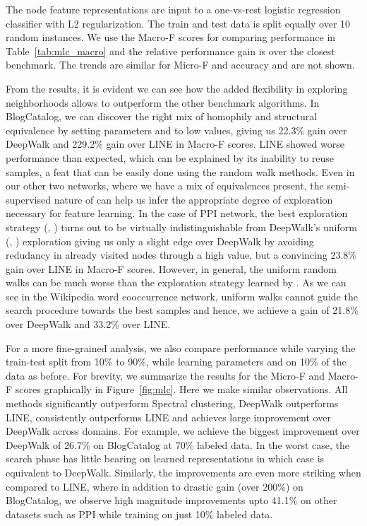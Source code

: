 The node feature representations are input to a one-vs-rest logistic regression classifier with L2 regularization. The train and test data is split equally over 10 random instances. We use the Macro-F scores for comparing performance in Table~\ref{tab:mlc_macro} and the relative performance gain is over the closest benchmark. The trends are similar for Micro-F and accuracy and are not shown. 

From the results, it is evident we can see how the added flexibility in exploring neighborhoods allows \nodevec to outperform the other benchmark algorithms. In BlogCatalog, we can discover the right mix of homophily and structural equivalence by setting parameters  and  to low values, giving us 22.3\% gain over DeepWalk and 229.2\% gain over LINE in Macro-F scores. LINE showed worse performance than expected, which can be explained by its inability to reuse samples, a feat that can be easily done using the random walk methods. Even in our other two networks, where we have a mix of equivalences present, the semi-supervised nature of \nodevec can help us infer the appropriate degree of exploration necessary for feature learning. In the case of PPI network, the best exploration strategy (, ) turns out to be virtually indistinguishable from DeepWalk's uniform (, ) exploration giving us only a slight edge over DeepWalk by avoiding redudancy in already visited nodes through a high  value, but a convincing 23.8\% gain over LINE in Macro-F scores. However, in general, the uniform random walks can be much worse than the exploration strategy learned by \nodevec. As we can see in the Wikipedia word cooccurrence network, uniform walks cannot guide the search procedure towards the best samples and hence, we achieve a gain of 21.8\% over DeepWalk and 33.2\% over LINE.

For a more fine-grained analysis, we also compare performance while varying the train-test split from 10\% to 90\%, while learning parameters  and  on 10\% of the data as before. For brevity, we summarize the results for the Micro-F and Macro-F scores graphically in Figure~\ref{fig:mlc}. Here we make similar observations. All methods significantly outperform Spectral clustering, DeepWalk outperforms LINE, \nodevec consistently outperforms LINE and achieves large improvement over DeepWalk across domains. For example, we achieve the biggest improvement over DeepWalk of 26.7\% on BlogCatalog at 70\% labeled data. In the worst case, the search phase has little bearing on learned representations in which case \nodevec is equivalent to DeepWalk. Similarly, the improvements are even more striking when compared to LINE, where in addition to drastic gain (over 200\%) on BlogCatalog, we observe high magnitude improvements upto 41.1\% on other datasets such as PPI while training on just 10\% labeled data.




